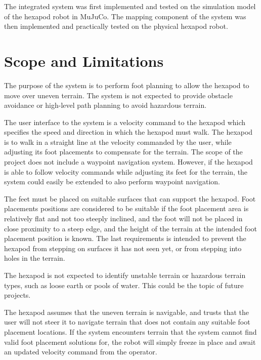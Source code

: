    The integrated system was first implemented and tested on the simulation model of the hexapod robot in MuJuCo. The mapping component of the system was then implemented and practically tested on the physical hexapod robot.

\section{Scope and Limitations}


    
    The purpose of the system is to perform foot planning to allow the hexapod to move over uneven terrain. The system is not expected to provide obstacle avoidance or high-level path planning to avoid hazardous terrain.

    The user interface to the system is a velocity command to the hexapod which specifies the speed and direction in which the hexapod must walk. The hexapod is to walk in a straight line at the velocity commanded by the user, while adjusting its foot placements to compensate for the terrain. The scope of the project does not include a waypoint navigation system. However, if the hexapod is able to follow velocity commands while adjusting its feet for the terrain, the system could easily be extended to also perform waypoint navigation.

    The feet must be placed on suitable surfaces that can support the hexapod. Foot placements positions are considered to be suitable if the foot placement area is relatively flat and not too steeply inclined, and the foot will not be placed in close proximity to a steep edge, and the height of the terrain at the intended foot placement position is known. The last requirements is intended to prevent the hexapod from stepping on surfaces it has not seen yet, or from stepping into holes in the terrain.

    The hexapod is not expected to identify unstable terrain or hazardous terrain types, such as loose
    earth or pools of water. This could be the topic of future projects.

    The hexapod assumes that the uneven terrain is navigable, and trusts that the user will not steer
    it to navigate terrain that does not contain any suitable foot placement locations. If the system encounters
    terrain that the system cannot find valid foot placement solutions for, the robot will simply freeze in place and await an updated velocity command from the
    operator.

